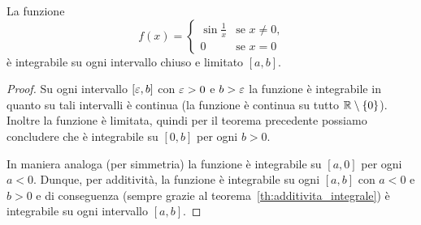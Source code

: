 \begin{example}
La funzione
\[
  f(x) = \begin{cases}
  \sin\frac 1 x & \text{se $x\neq 0$,}\\
  0 & \text{se $x=0$}
  \end{cases}
\]
è integrabile su ogni intervallo chiuso e limitato $[a,b]$.
\end{example}
\begin{proof}
Su ogni intervallo $[\varepsilon,b]$ con $\varepsilon>0$ e $b>\varepsilon$ la funzione
è integrabile in quanto su tali intervalli è continua (la funzione è continua su
tutto ${\mathbb R}\setminus{\left\{ 0 \right\}}$). Inoltre la funzione è limitata, quindi per il teorema
precedente possiamo concludere che è integrabile su $[0,b]$ per ogni $b>0$.

In maniera analoga (per simmetria) la funzione è integrabile su $[a,0]$
per ogni $a<0$.
Dunque, per additività, la funzione è integrabile su ogni $[a,b]$ con $a<0$ e $b>0$
e di conseguenza (sempre grazie al teorema~\ref{th:additivita_integrale})
è integrabile su ogni intervallo $[a,b]$.
\end{proof}

